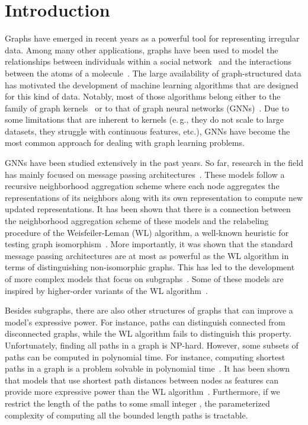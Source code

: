 \documentclass{article}
\theoremstyle{plain}
\theoremstyle{definition}
\theoremstyle{remark}
\newcommand{\eg}{e.\,g., }
\begin{document}
\section{Introduction}
Graphs have emerged in recent years as a powerful tool for representing irregular data.
Among many other applications, graphs have been used to model the relationships between individuals within a social network~\cite{easley2010networks} and the interactions between the atoms of a molecule~\cite{stokes2020deep}.
The large availability of graph-structured data has motivated the development of machine learning algorithms that are designed for this kind of data.
Notably, most of those algorithms belong either to the family of graph kernels~\cite{kriege2020survey,borgwardt2020graph,nikolentzos2021graph} or to that of graph neural networks (GNNs)~\cite{wu2020comprehensive,zhou2020graph}.
Due to some limitations that are inherent to kernels (\eg they do not scale to large datasets, they struggle with continuous features, etc.), GNNs have become the most common approach for dealing with graph learning problems.

GNNs have been studied extensively in the past years.
So far, research in the field has mainly focused on message passing architectures~\cite{gilmer2017neural}.
These models follow a recursive neighborhood aggregation scheme where each node aggregates the representations of its neighbors along with its own representation to compute new updated representations.
It has been shown that there is a connection between the neighborhood aggregation scheme of these models and the relabeling procedure of the Weisfeiler-Leman (WL) algorithm, a well-known heuristic for testing graph isomorphism~\cite{xu2019powerful,morris2019weisfeiler}.
More importantly, it was shown that the standard message passing architectures are at most as powerful as the WL algorithm in terms of distinguishing non-isomorphic graphs.
This has led to the development of more complex models that focus on subgraphs~\cite{maron2019invariant,maron2019provably,cotta2021reconstruction}.
Some of these models are inspired by higher-order variants of the WL algorithm~\cite{morris2019weisfeiler,morris2020weisfeiler}.

Besides subgraphs, there are also other structures of graphs that can improve a model's expressive power.
For instance, paths can distinguish connected from disconnected graphs, while the WL algorithm fails to distinguish this property.
Unfortunately, finding all paths in a graph is NP-hard. 
However, some subsets of paths can be computed in polynomial time.
For instance, computing shortest paths in a graph is a problem solvable in polynomial time~\cite{dijkstra1959note}.
It has been shown that models that use shortest path distances between nodes as features can provide more expressive power than the WL algorithm~\cite{li2020distance}.
Furthermore, if we restrict the length of the paths to some small integer , the parameterized complexity of computing all the bounded length paths is tractable.
\end{document}

